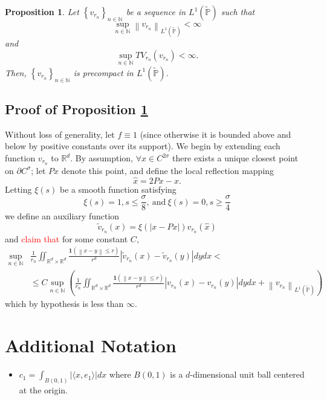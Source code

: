 \documentclass{article}
\newcommand{\Reals}{\mathbb{R}}
\newcommand{\norm}[1]{\left\lVert#1\right\rVert}
\newcommand{\dotp}[2]{\langle #1 , #2 \rangle}
\newcommand{\abs}[1]{\left \lvert #1 \right \rvert}
\newcommand{\set}[1]{\left\{#1\right\}}
\newcommand{\seq}[1]{\set{#1}_{n \in \N}}
\newcommand{\Naturals}{\mathbb{N}}
\newcommand{\N}{\mathbb{N}}
\newcommand{\Pbb}{\mathbb{P}}
\newcommand{\1}{\mathbf{1}}
\theoremstyle{alden}
\theoremstyle{aldenthm}
\newtheorem{proposition}{Proposition}
\theoremstyle{remark}
\begin{document}
\begin{proposition}
	\label{prop: compactness_nonlocal_TV}
	Let $\seq{v_{r_n}}$ be a sequence in $L^1(\widetilde{\Pbb})$ such that
	\begin{equation*}
	\sup_{n \in \Naturals} \norm{v_{r_n}}_{L^1(\widetilde{\Pbb})} < \infty 
	\end{equation*}
	and
	\begin{equation*}
	\sup_{n \in \Naturals} TV_{r_n}(v_{r_n}) < \infty.
	\end{equation*}
	Then, $\seq{v_{r_n}}$ is precompact in $L^1(\widetilde{\Pbb})$. 
\end{proposition}

\subsection{Proof of Proposition \ref{prop: compactness_nonlocal_TV}}
\label{sub: proof_of_prop_compactness_nonlocal_TV}

Without loss of generality, let $f \equiv 1$ (since otherwise it is bounded above and below by positive constants over its support). We begin by extending each function $v_{r_n}$ to $\Reals^d$. By assumption, $\forall x \in C^{2\sigma}$ there exists a unique closest point on $\partial C^{\sigma}$; let $Px$ denote this point, and define the local reflection mapping
\begin{equation*}
\widehat{x} = 2Px - x.
\end{equation*}
Letting $\xi(s)$ be a smooth function satisfying
\begin{equation*}
\xi(s) = 1, s \leq \frac{\sigma}{8},~ \text{and}~ \xi(s) = 0, s \geq \frac{\sigma}{4}
\end{equation*}
we define an auxiliary function
\begin{equation*}
\widetilde{v}_{r_n}(x) = \xi(\abs{x - Px}) v_{r_n}(\widehat{x})
\end{equation*}
and \textcolor{red}{claim that} for some constant $C$,
\begin{align*}
\sup_{n \in \Naturals} & \frac{1}{r_n} \iint_{\Reals^d \times \Reals^d} \frac{\1(\norm{x - y} \leq r)}{r^d} \abs{\widetilde{v}_{r_n}(x) - \widetilde{v}_{r_n}(y)} dy dx < \\
& \leq C \sup_{n \in \Naturals} \left(\frac{1}{r_n} \iint_{\Reals^d \times \Reals^d} \frac{\1(\norm{x - y} \leq r)}{r^d} \abs{v_{r_n}(x) - v_{r_n}(y)} dy dx +  \norm{v_{r_n}}_{L^1(\widetilde{\Pbb})}\right)
\end{align*}
which by hypothesis is less than $\infty$. 

\section{Additional Notation}
\begin{itemize}
	\item $c_1 = \int_{B(0,1)} \abs{\dotp{x}{e_1}} dx$ where $B(0,1)$ is a $d$-dimensional unit ball centered at the origin.
\end{itemize}
\end{document}
